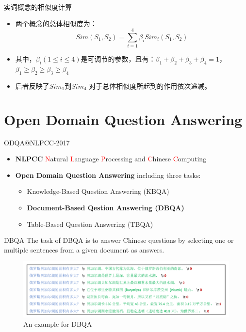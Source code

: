 \documentclass{beamer}
\begin{document}
    \begin{frame}{实词概念的相似度计算}
      \begin{itemize}
        \item 两个概念的总体相似度为：
        \begin{equation}
          Sim(S_1, S_2) = \sum_{i=1}^4 {\beta}_i Sim_i(S_1, S_2)
        \end{equation}
        \item 其中，${\beta}_i (1 \leq i \leq 4)$是可调节的参数，且有：${\beta}_1+{\beta}_2+{\beta}_3+{\beta}_4=1$，${\beta}_1 \geq {\beta}_2 \geq {\beta}_3 \geq {\beta}_4$
        \item 后者反映了$Sim_1$到$Sim_4$ 对于总体相似度所起到的作用依次递减。
    \end{itemize}
    \end{frame}

  \section{Open Domain Question Answering}
  \begin{frame}{ODQA@NLPCC-2017}
    \begin{itemize}
    \item \textbf{NLPCC} \newline
    \textcolor{red}{N}atural \textcolor{red}{L}anguage \textcolor{red}{P}rocessing and \textcolor{red}{C}hinese \textcolor{red}{C}omputing \newline 
    \item \textbf{Open Domain Question Answering} \newline
    including three tasks:
      \begin{itemize}
        \item Knowledge-Based Question Answering (KBQA)
        \item \textbf{Document-Based Qestion Answering (DBQA)}
        \item Table-Based Question Answering (TBQA)
      \end{itemize}
    \end{itemize} 
  \end{frame}

  \begin{frame}{DBQA}
    The task of DBQA is to answer Chinese questions by selecting one or multiple sentences from a given document as answers. \newline
    \begin{center}
      \begin{figure}
      \includegraphics[width=\textwidth,height=\textheight,keepaspectratio]{dbqa-example.png}
      \caption{An example for DBQA}
      \end{figure}
    \end{center}
  \end{frame}
\end{document}
